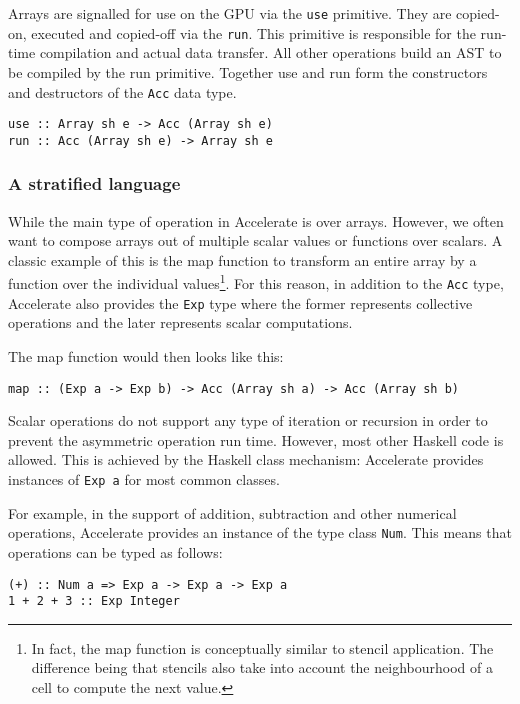 Arrays are signalled for use on the GPU via the \texttt{use} primitive.
They are copied-on, executed and copied-off via the \texttt{run}. This
primitive is responsible for the run-time compilation and actual data
transfer. All other operations build an AST to be compiled by the run
primitive. Together use and run form the constructors and destructors of
the \texttt{Acc} data type.

\begin{verbatim}
use :: Array sh e -> Acc (Array sh e)
run :: Acc (Array sh e) -> Array sh e
\end{verbatim}

\subsubsection{A stratified language}

While the main type of operation in Accelerate is over arrays. However,
we often want to compose arrays out of multiple scalar values or
functions over scalars. A classic example of this is the map function to
transform an entire array by a function over the individual
values\footnote{In fact, the map function is conceptually similar to
  stencil application. The difference being that stencils also take into
  account the neighbourhood of a cell to compute the next value.}. For
this reason, in addition to the \texttt{Acc} type, Accelerate also
provides the \texttt{Exp} type where the former represents collective
operations and the later represents scalar computations.

The map function would then looks like this:

\begin{verbatim}
map :: (Exp a -> Exp b) -> Acc (Array sh a) -> Acc (Array sh b)
\end{verbatim}

Scalar operations do not support any type of iteration or recursion in
order to prevent the asymmetric operation run time. However, most other
Haskell code is allowed. This is achieved by the Haskell class
mechanism: Accelerate provides instances of \texttt{Exp a} for most
common classes.

For example, in the support of addition, subtraction and other numerical
operations, Accelerate provides an instance of the type class
\texttt{Num}. This means that operations can be typed as follows:

\begin{verbatim}
(+) :: Num a => Exp a -> Exp a -> Exp a
1 + 2 + 3 :: Exp Integer
\end{verbatim}

